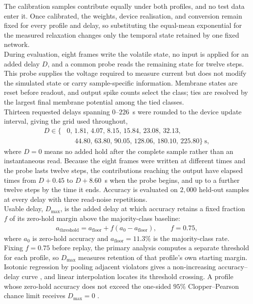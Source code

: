 \noindent The calibration samples contribute equally under both profiles, and no test data enter it. Once calibrated,
the weights, device realisation, and conversion remain fixed for every profile and delay, so substituting the
equal-mean exponential for the measured relaxation changes only the temporal state retained by one fixed network.\\

\noindent During evaluation, eight frames write the volatile state, no input is applied for an added delay $D$, and a
common probe reads the remaining state for twelve steps. This probe supplies the voltage required to measure current
but does not modify the simulated state or carry sample-specific information. Membrane states are reset before
readout, and output spike counts select the class; ties are resolved by the largest final membrane potential among
the tied classes.\\

\noindent Thirteen requested delays spanning $0$--$226$~s were rounded to the device update interval, giving the grid
used throughout,
\begin{align}
    D \in \{ &0,\, 1.81,\, 4.07,\, 8.15,\, 15.84,\, 23.08,\, 32.13, \nonumber \\
    &\quad\, 44.80,\, 63.80,\, 90.05,\, 128.06,\, 180.10,\, 225.80 \}~\mathrm{s},
    \label{eq:6grid}
\end{align}
\noindent where $D=0$ means no added hold after the complete sample rather than an instantaneous read. Because the
eight frames were written at different times and the probe lasts twelve steps, the contributions reaching the output
have elapsed times from $D+0.45$ to $D+8.60$~s when the probe begins, and up to a further twelve steps by the time it
ends. Accuracy is evaluated on $2{,}000$ held-out samples at every delay with three read-noise repetitions.\\

\noindent Usable delay, $D_{\max}$, is the added delay at which accuracy retains a fixed fraction $f$ of its
zero-hold margin above the majority-class baseline:
\begin{align}
    a_{\mathrm{threshold}} = a_{\mathrm{floor}} + f\left( a_{0} - a_{\mathrm{floor}} \right), \qquad f = 0.75,
    \label{eq:6.48}
\end{align}
\noindent where $a_0$ is zero-hold accuracy and $a_{\mathrm{floor}}=11.3\%$ is the majority-class rate. Fixing
$f=0.75$ before replay, the primary analysis computes a separate threshold for each profile, so $D_{\max}$ measures
retention of that profile's own starting margin. Isotonic regression by pooling adjacent violators gives a
non-increasing accuracy--delay curve \cite{ayer1955empirical}, and linear interpolation locates its threshold
crossing. A profile whose zero-hold accuracy does not exceed the
one-sided $95\%$ Clopper--Pearson chance limit receives $D_{\max}=0$ \cite{clopper1934confidence}.\\

